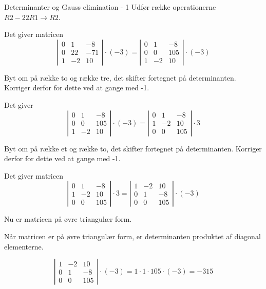 \documentclass{article}
\begin{document}
\begin{exercise}{Determinanter og Gauss elimination - 1}
\hint
Udfør række operationerne
$R2 - 22R1 \to R2$.

\hint
Det giver matricen
\[
\left|\begin{array}{rrr}
0 & 1 & -8 \\
0 & 22 & -71 \\
1 & -2 & 10
\end{array} \right| \cdot (-3) =
\left|\begin{array}{rrr}
0 & 1 & -8 \\
0 & 0 & 105 \\
1 & -2 & 10
\end{array} \right| \cdot (-3)
\]

\hint
Byt om på række to og række tre, det skifter fortegnet på determinanten.
Korriger derfor for dette ved at gange med -1.

\hint
Det giver
\[
\left|\begin{array}{rrr}
0 & 1 & -8 \\
0 & 0 & 105 \\
1 & -2 & 10
\end{array} \right| \cdot (-3) =
\left|\begin{array}{rrr}
0 & 1 & -8 \\
1 & -2 & 10 \\
0 & 0 & 105
\end{array} \right| \cdot 3
\]

\hint
Byt om på række et og række to, det skifter fortegnet på determinanten.
Korriger derfor for dette ved at gange med -1.

\hint
Det giver matricen
\[
\left|\begin{array}{rrr}
0 & 1 & -8 \\
1 & -2 & 10 \\
0 & 0 & 105
\end{array} \right| \cdot 3 =
\left|\begin{array}{rrr}
1 & -2 & 10 \\
0 & 1 & -8 \\
0 & 0 & 105
\end{array} \right| \cdot (-3)
\]

\hint
Nu er matricen på øvre triangulær form.

\hint
Når matricen er på øvre triangulær form, er determinanten
produktet af diagonal elementerne.

\hint
\[
\left|\begin{array}{rrr}
1 & -2 & 10 \\
0 & 1 & -8 \\
0 & 0 & 105
\end{array} \right| \cdot (-3)
= 1 \cdot 1 \cdot 105 \cdot (-3)
= -315
\]

\end{exercise}
\end{document}
